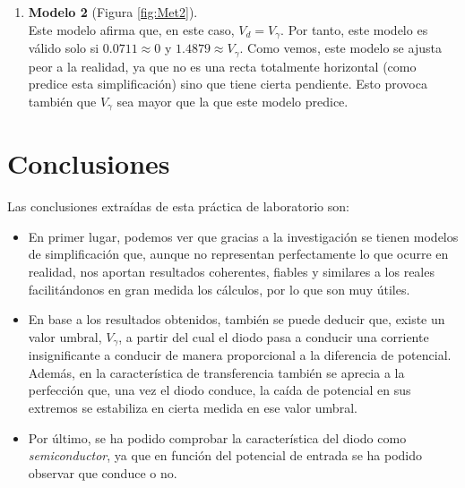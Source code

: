 \begin{description}
\begin{enumerate}
        \item \textbf{Modelo 2} (Figura \ref{fig:Met2}).\\
        Este modelo afirma que, en este caso, $V_d = V_\gamma$.
        Por tanto, este modelo es válido solo si $0.0711\approx 0$ y $1.4879 \approx V_\gamma$. Como vemos, este modelo se ajusta peor a la realidad, ya que no es una recta totalmente horizontal (como predice esta simplificación) sino que tiene cierta pendiente. Esto provoca también que $V_\gamma$ sea mayor que la que este modelo predice.
    \end{enumerate}
    
\end{description}


\section{Conclusiones}
Las conclusiones extraídas de esta práctica de laboratorio son:
\begin{itemize}
    \item En primer lugar, podemos ver que gracias a la investigación se tienen modelos de simplificación que, aunque no representan perfectamente lo que ocurre en realidad, nos aportan resultados coherentes, fiables y similares a los reales facilitándonos en gran medida los cálculos, por lo que son muy útiles.
    
    \item En base a los resultados obtenidos, también se puede deducir que, existe un valor umbral, $V_\gamma$, a partir del cual el diodo pasa a conducir una corriente insignificante a conducir de manera proporcional a la diferencia de potencial. Además, en la característica de transferencia también se aprecia a la perfección que, una vez el diodo conduce, la caída de potencial en sus extremos se estabiliza en cierta medida en ese valor umbral.

    \item Por último, se ha podido comprobar la característica del diodo como \emph{semiconductor}, ya que en función del potencial de entrada se ha podido observar que conduce o no.
\end{itemize}